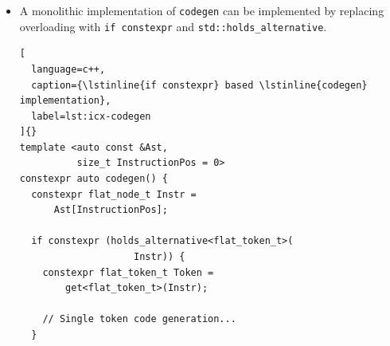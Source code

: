 \documentclass[../main]{subfiles}
\begin{document}
\begin{itemize}
The trickiest part of code generation is generating code blocks, as shown in
listing \ref{lst:ol-codegen-block}. Doing so requires the use of a compile time
unrolling technique based on \cpp parameter packs.
Iteration over the elements must be done that way to keep the index
\gls{constexpr} and use it as a \gls{nttp} to generate code.

The result of this metafunction is an anonymous function that evaluates all the
Brainfuck code within a block. At this point the only function that remains
is the \lstinline{flat_while_t} overload.

\begin{lstlisting}[
  language=c++,
  caption={
    \lstinline{codegen} specialization
    for \lstinline{flat_while_t} elements
  },
  label=lst:ol-codegen-while
]{}
/// Code generation implementation
/// for a while block
template <auto const &Ast,
          size_t InstructionPos = 0>
constexpr auto codegen(flat_while_t) {
  return [](program_state_t &s) {
    while (s.data[s.i]) {
      codegen<Ast, get<flat_while_t>(
                       Ast[InstructionPos])
                       .block_begin>()(s);
    }
  };
}
\end{lstlisting}

The \lstinline{codegen} implementation for a while block
\ref{lst:ol-codegen-while} is trivial: it returns a function that runs a while
loop as defined by the Brainfuck language specification, and the body itself is
the code generation result for the block element it points to.

This implementation is a good way to show how code generation from a \gls{nttp}
can be implemented for a serialized \gls{ast}.

\item
A monolithic implementation of \lstinline{codegen} can be implemented by
replacing overloading with \lstinline{if constexpr} and
\lstinline{std::holds_alternative}.

\begin{lstlisting}[
  language=c++,
  caption={\lstinline{if constexpr} based \lstinline{codegen} implementation},
  label=lst:icx-codegen
]{}
template <auto const &Ast,
          size_t InstructionPos = 0>
constexpr auto codegen() {
  constexpr flat_node_t Instr =
      Ast[InstructionPos];

  if constexpr (holds_alternative<flat_token_t>(
                    Instr)) {
    constexpr flat_token_t Token =
        get<flat_token_t>(Instr);

    // Single token code generation...
  }


\end{lstlisting}
\end{itemize}
\end{document}
